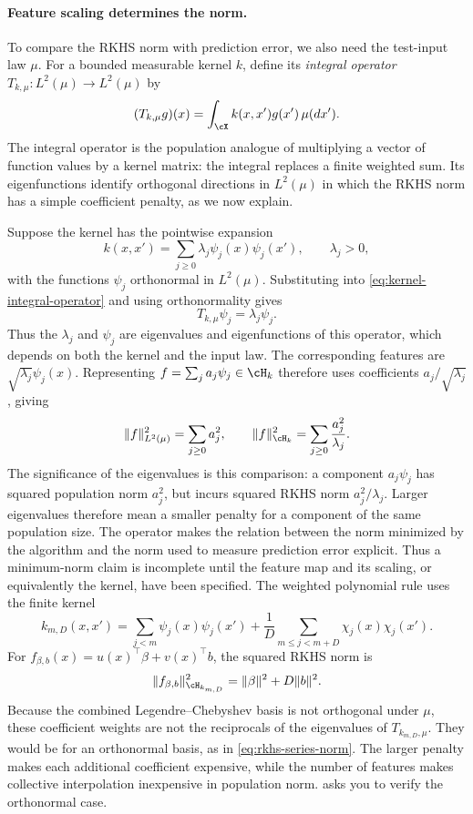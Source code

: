 \documentclass[11pt,twoside]{article}
\theoremstyle{definition}
\theoremstyle{remark}
\begin{document}
\paragraph{Feature scaling determines the norm.}
To compare the RKHS norm with prediction error, we also need the test-input
law $\mu$. For a bounded measurable kernel $k$, define its
\emph{integral operator} $T_{k,\mu}:L^2(\mu)\to L^2(\mu)$ by
\begin{equation}
 (T_{k,\mu}g)(x)=\int_{\cX} k(x,x')g(x')\,\mu(dx').
 \label{eq:kernel-integral-operator}
\end{equation}
The integral operator is the population analogue of multiplying a vector of function values
by a kernel matrix: the integral replaces a finite weighted sum. Its
eigenfunctions identify orthogonal directions in $L^2(\mu)$ in which the
RKHS norm has a simple coefficient penalty, as we now explain.

Suppose the kernel has the pointwise expansion
\begin{equation}
 k(x,x')=\sum_{j\ge0}\lambda_j\psi_j(x)\psi_j(x'),
 \qquad \lambda_j>0,
 \label{eq:kernel-expansion}
\end{equation}
with the functions $\psi_j$ orthonormal in $L^2(\mu)$. Substituting into
\cref{eq:kernel-integral-operator} and using orthonormality gives
\[
 T_{k,\mu}\psi_j=\lambda_j\psi_j.
\]
Thus the $\lambda_j$ and $\psi_j$ are eigenvalues and eigenfunctions of
this operator, which depends on both the kernel and the input law.
The corresponding features are $\sqrt{\lambda_j}\psi_j(x)$. Representing
$f=\sum_ja_j\psi_j\in\cH_k$ therefore uses coefficients
$a_j/\sqrt{\lambda_j}$, giving
\begin{equation}
 \|f\|_{L^2(\mu)}^2=\sum_{j\ge0}a_j^2,
 \qquad
 \|f\|_{\cH_k}^2=\sum_{j\ge0}\frac{a_j^2}{\lambda_j}.
 \label{eq:rkhs-series-norm}
\end{equation}
The significance of the eigenvalues is this comparison: a component
$a_j\psi_j$ has squared population norm $a_j^2$, but incurs squared RKHS
norm $a_j^2/\lambda_j$. Larger eigenvalues therefore mean a smaller penalty
for a component of the same population size. The operator makes the
relation between the norm minimized by the algorithm and the norm used to
measure prediction error explicit.
Thus a minimum-norm claim is incomplete until the feature map and its scaling,
or equivalently the kernel, have been specified. The weighted polynomial rule
uses the finite kernel
\begin{equation}
 k_{m,D}(x,x')=
 \sum_{j<m}\psi_j(x)\psi_j(x')
 +\frac1D\sum_{m\le j<m+D}\chi_j(x)\chi_j(x').
 \label{eq:polynomial-kernel}
\end{equation}
For $f_{\beta,b}(x)=u(x)^\top\beta+v(x)^\top b$, the squared RKHS norm is
\[
 \|f_{\beta,b}\|_{\cH_{k_{m,D}}}^2=\|\beta\|^2+D\|b\|^2.
\]
Because the combined
Legendre--Chebyshev basis is not orthogonal under $\mu$, these coefficient
weights are not the reciprocals of the eigenvalues of $T_{k_{m,D},\mu}$.
They would be for an orthonormal basis, as in \cref{eq:rkhs-series-norm}.
The larger penalty makes each additional coefficient expensive, while the
number of features makes collective interpolation inexpensive in population
norm.  asks you to verify the orthonormal case.
\end{document}
